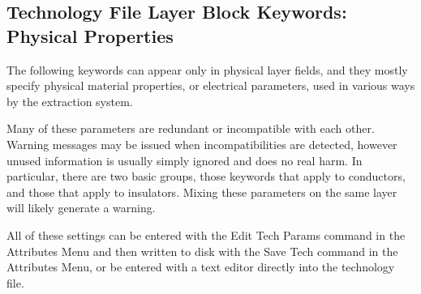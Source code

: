 \subsection{Technology File Layer Block Keywords:  Physical Properties}
\label{phkwords}

The following keywords can appear only in physical layer fields, and
they mostly specify physical material properties, or electrical
parameters, used in various ways by the extraction system.

Many of these parameters are redundant or incompatible with each
other.  Warning messages may be issued when incompatibilities are
detected, however unused information is usually simply ignored and
does no real harm.  In particular, there are two basic groups, those
keywords that apply to conductors, and those that apply to insulators. 
Mixing these parameters on the same layer will likely generate a
warning.

All of these settings can be entered with the {\cb Edit Tech Params}
command in the {\cb Attributes Menu} and then written to disk with the
{\cb Save Tech} command in the {\cb Attributes Menu}, or be entered
with a text editor directly into the technology file.

